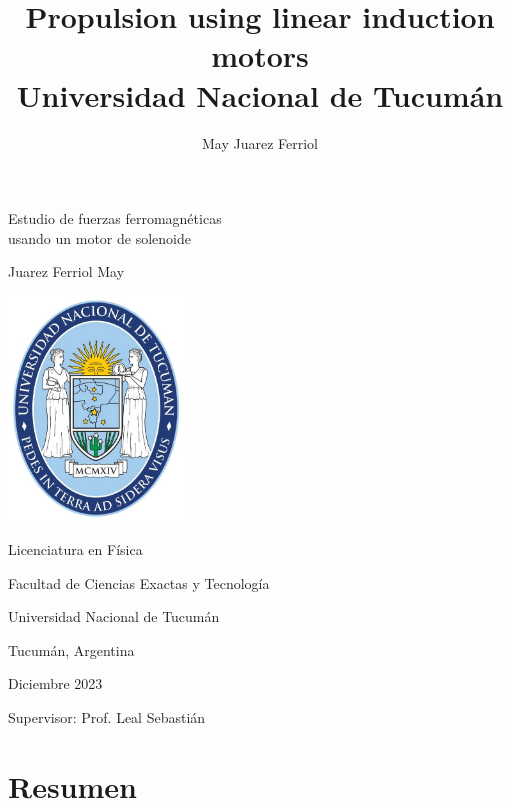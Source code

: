\documentclass[a4paper,12pt]{article}
\title{Propulsion using linear induction motors\\ 
\medskip \large Universidad Nacional de Tucumán}
\author{May Juarez Ferriol}
\date{}
\begin{document}
\begin{titlepage}

    \begin{center}

        \vspace*{2cm}

        \Huge
        Estudio de fuerzas ferromagnéticas \\
        usando un motor de solenoide

        \vspace{1cm}

        \LARGE
        Juarez Ferriol May

        \vspace{1cm}

        \includegraphics[width=0.35\textwidth]{unt.jpg}

        \vspace{1cm}

        \Large
        Licenciatura en Física

        Facultad de Ciencias Exactas y Tecnología

        Universidad Nacional de Tucumán

        Tucumán, Argentina

        \vspace{1cm}

        Diciembre 2023

        \vspace{1cm}

        Supervisor: Prof. Leal Sebastián

    \end{center}

\end{titlepage}

\section*{Resumen}
\end{document}
